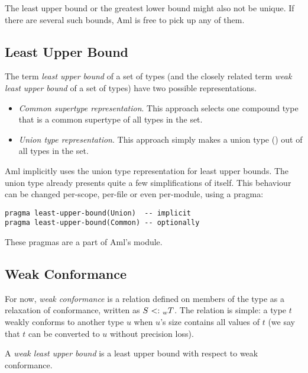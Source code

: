 The least upper bound or the greatest lower bound might also not be unique. If there are several such bounds, Aml is free to pick up any of them. 




\subsection{Least Upper Bound}
\label{sec:least-upper-bound}

The term {\em least upper bound} of a set of types (and the closely related term {\em weak least upper bound} of a set of types) have two possible representations. 

\begin{itemize}
  \item {\em Common supertype representation}. This approach selects one compound type that is a common supertype of all types in the set. 
  \item {\em Union type representation}. This approach simply makes a union type () out of all types in the set. 
\end{itemize}

Aml implicitly uses the union type representation for least upper bounds. The union type already presents quite a few simplifications of itself. This behaviour can be changed per-scope, per-file or even per-module, using a pragma:
\begin{lstlisting}
pragma least-upper-bound(Union)  -- implicit
pragma least-upper-bound(Common) -- optionally
\end{lstlisting}
These pragmas are a part of Aml's  module. %





\subsection{Weak Conformance}
\label{sec:weak-conformance}

For now, {\em weak conformance} is a relation defined on members of the  type as a relaxation of conformance, written as $S \conforms _w T$. The relation is simple: a type $t$ weakly conforms to another type $u$ when $u$'s size contains all values of $t$ (we say that $t$ can be converted to $u$ without precision loss). 

A {\em weak least upper bound} is a least upper bound with respect to weak conformance. 





